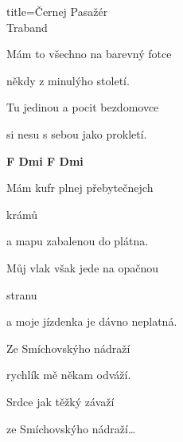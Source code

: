 \begin{song}{title=\predtitle\centering Černej Pasažér \\\large Traband \vspace*{-0.3cm}}
\begin{centerjustified}
\begin{varwidth}[t]{0.48\textwidth}
\sloka
Mám to všechno na barevný fotce  

někdy z minulýho století. 

Tu jedinou a pocit bezdomovce 

si nesu s sebou jako prokletí.

\mezera
\textbf{F  Dmi F  Dmi }


\sloka
Mám kufr plnej přebytečnejch 

krámů 

a mapu zabalenou do plátna. 

Můj vlak však jede na opačnou 

stranu 

a moje jízdenka je dávno neplatná.


\sloka
Ze Smíchovskýho nádraží

rychlík mě někam odváží.

Srdce jak těžký závaží

ze Smíchovskýho nádraží\elipsa\dots

\end{varwidth}   %
\end{centerjustified}
\end{song}
\setcounter{Slokočet}{0}
